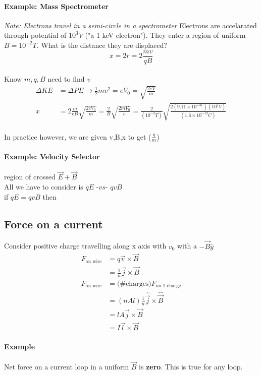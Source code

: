 \documentclass{article}
\begin{document}
    \paragraph{Example: Mass Spectrometer}
    \textit{Note: Electrons travel in a semi-circle in a spectrometer}
    Electrons are accelarated through potential of $10^3 V$ ("a 1 keV electron"). 
    They enter a region of uniform $B = 10^{-2}T$. What is the distance they are displaced?
    $$x = 2r = 2 \frac{mv}{qB}$$\\
    Know $m,q,B$ need to find $v$\\
    \begin{align*}
        \Delta KE &= \Delta PE \rightarrow \frac{1}{2}mv^2 = eV_0= \sqrt{\frac{2eV}{m}} \\
        x &= 2\frac{m}{eB}\sqrt{\frac{2eV_0}{m}} = \frac{2}{B}\sqrt{\frac{2mV_0}{e}} = \frac{2}{(10^{-2}T)}\sqrt{\frac{2(9.11\times 10^{-31})(10^3V)}{(1.6\times 10^{-19}C)}}        
    \end{align*}
    \\In practice however, we are given v,B,x to get ($\frac{q}{m}$)

    \paragraph{Example: Velocity Selector}region of crossed $\vec{E} + \vec{B}$\\
    All we have to consider is $qE \textit{ -vs- } qvB$\\
    if $qE = qvB$ then 

    \subsection{Force on a current}
    Consider positive charge travelling along x axis with $v_0$ with a $-\vec{B}\hat{y}$
    \begin{align*}
        F_{\text{on wire}} &= q\vec{v}\times\vec{B}\\
        &= \frac{1}{n}\vec{j}\times\vec{B}\\
       F_{\text{on wire}}&=\text{(\# charges)}F_{\text{on 1 charge}}\\
       &=(nAl)\frac{1}{n}\hat{\vec{j}}\times\hat{\vec{B}}\\
       &=lA\vec{j}\times\vec{B}\\
       &=I\vec{l}\times\vec{B}
    \end{align*}
    \paragraph{Example}
    Net force on a current loop in a uniform $\vec{B}$ is \textbf{zero}. 
    This is true for any loop.
\end{document}
